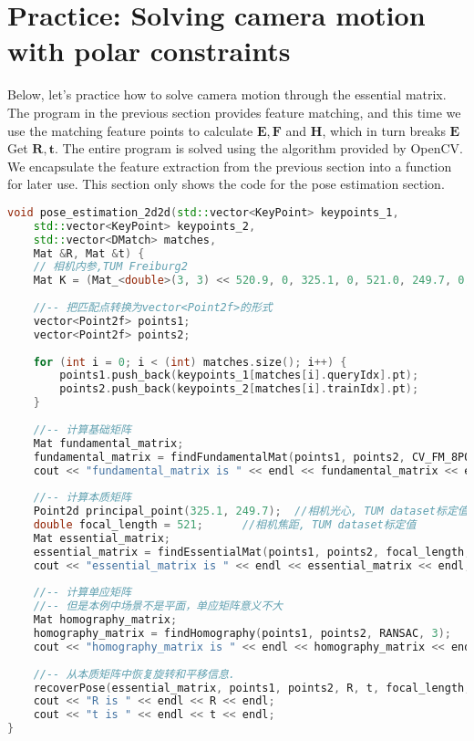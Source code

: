 \section{Practice: Solving camera motion with polar constraints}
Below, let's practice how to solve camera motion through the essential matrix. The program in the previous section provides feature matching, and this time we use the matching feature points to calculate $\bm{E}, \bm{F}$ and $\bm{H}$, which in turn breaks $ \bm{E}$Get $\bm{R}, \bm{t}$. The entire program is solved using the algorithm provided by OpenCV. We encapsulate the feature extraction from the previous section into a function for later use. This section only shows the code for the pose estimation section.
\begin{lstlisting}[language=c++,caption=slambook2/ch7/pose_estimation_2d2d.cpp （片段）]
void pose_estimation_2d2d(std::vector<KeyPoint> keypoints_1,
    std::vector<KeyPoint> keypoints_2,
    std::vector<DMatch> matches,
    Mat &R, Mat &t) {
    // 相机内参,TUM Freiburg2
    Mat K = (Mat_<double>(3, 3) << 520.9, 0, 325.1, 0, 521.0, 249.7, 0, 0, 1);
    
    //-- 把匹配点转换为vector<Point2f>的形式
    vector<Point2f> points1;
    vector<Point2f> points2;
    
    for (int i = 0; i < (int) matches.size(); i++) {
        points1.push_back(keypoints_1[matches[i].queryIdx].pt);
        points2.push_back(keypoints_2[matches[i].trainIdx].pt);
    }
    
    //-- 计算基础矩阵
    Mat fundamental_matrix;
    fundamental_matrix = findFundamentalMat(points1, points2, CV_FM_8POINT);
    cout << "fundamental_matrix is " << endl << fundamental_matrix << endl;
    
    //-- 计算本质矩阵
    Point2d principal_point(325.1, 249.7);  //相机光心, TUM dataset标定值
    double focal_length = 521;      //相机焦距, TUM dataset标定值
    Mat essential_matrix;
    essential_matrix = findEssentialMat(points1, points2, focal_length, principal_point);
    cout << "essential_matrix is " << endl << essential_matrix << endl;
    
    //-- 计算单应矩阵
    //-- 但是本例中场景不是平面，单应矩阵意义不大
    Mat homography_matrix;
    homography_matrix = findHomography(points1, points2, RANSAC, 3);
    cout << "homography_matrix is " << endl << homography_matrix << endl;
    
    //-- 从本质矩阵中恢复旋转和平移信息.
    recoverPose(essential_matrix, points1, points2, R, t, focal_length, principal_point);
    cout << "R is " << endl << R << endl;
    cout << "t is " << endl << t << endl;
}
\end{lstlisting}

